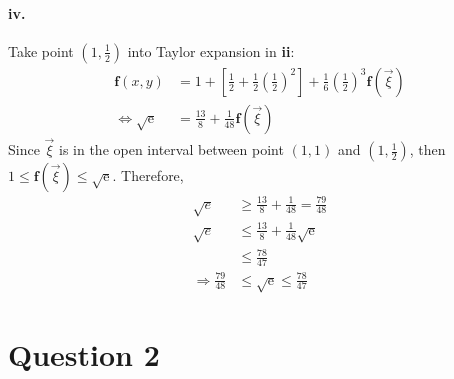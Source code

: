 \documentclass[11pt, a4paper]{article}
\begin{document}
\paragraph{iv.} Take point $(1, \frac{1}{2})$ into Taylor expansion in \textbf{ii}:
$$\begin{aligned}
    \bm{f}(x, y) &= 1 + [\frac{1}{2} + \frac{1}{2}(\frac{1}{2}) ^ 2] + \frac{1}{6}(\frac{1}{2}) ^ 3 \bm{f}(\vec{\xi}) \\
    \Leftrightarrow
    \sqrt{\mathrm{e}} &= \frac{13}{8} + \frac{1}{48}\bm{f}(\vec{\xi})
\end{aligned}$$
Since $\vec{\xi}$ is in the open interval between point $(1, 1)$ and $(1, \frac{1}{2})$, then $1 \leq \bm{f}(\vec{\xi}) \leq \sqrt{\mathrm{e}}$. Therefore, 
$$\begin{aligned}
    \sqrt{e} &\geq \frac{13}{8} + \frac{1}{48} = \frac{79}{48} \\
    \sqrt{e} &\leq \frac{13}{8} + \frac{1}{48}\sqrt{\mathrm{e}} \\
    &\leq \frac{78}{47} \\
    \Rightarrow
    \frac{79}{48} &\leq \sqrt{\mathrm{e}} \leq \frac{78}{47}
\end{aligned}$$

\section*{Question 2}
\end{document}
